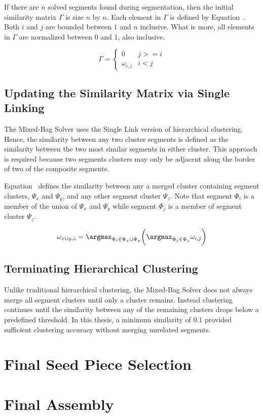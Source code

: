If there are $n$ solved segments found during segmentation, then the initial similarity matrix $\Gamma$ is size $n$ by $n$.  Each element in $\Gamma$ is defined by Equation~.  Both $i$ and $j$ are bounded between $1$ and $n$ inclusive.  What is more, all elements in $\Gamma$ are normalized between 0 and 1, also inclusive.

\begin{equation} \label{eq:similarityMatrix}
\Gamma = \begin{cases} 
	0 & j >= i
\\
	\omega_{i,j} & i < j
\end{cases} 
\end{equation}

\subsection{Updating the Similarity Matrix via Single Linking}

The Mixed-Bag Solver uses the Single Link version of hierarchical clustering.  Hence, the similarity between any two cluster segments is defined as the similarity between the two most similar segments in either cluster.  This approach is required because two segments clusters may only be adjacent along the border of two of the composite segments.  

Equation~ defines the similarity between any a merged cluster containing segment clusters, $\Psi_x$ and $\Psi_y$, and any other segment cluster $\Psi_z$.  Note that segment $\Phi_i$ is a member of the union of $\Psi_x$ and $\Psi_y$ while segment $\Phi_j$ is a member of segment cluster $\Psi_z$.

\begin{equation} \label{eq:segmentClusterMerge}
	\omega_{x \cup y,z} = \argmax_{\Phi_i \in \Psi_x \cup \Psi_y} \bigg( \argmax_{\Phi_j \in \Psi_z} \omega_{i,j} \bigg) 
\end{equation}

\subsection{Terminating Hierarchical Clustering}

Unlike traditional hierarchical clustering, the Mixed-Bag Solver does not always merge all segment clusters  until only a cluster remains. Instead clustering continues until the similarity between any of the remaining clusters drops below a predefined threshold.  In this thesis, a minimum similarity of $0.1$ provided sufficient clustering accuracy without merging unrelated segments.

\section{Final Seed Piece Selection}

\section{Final Assembly}